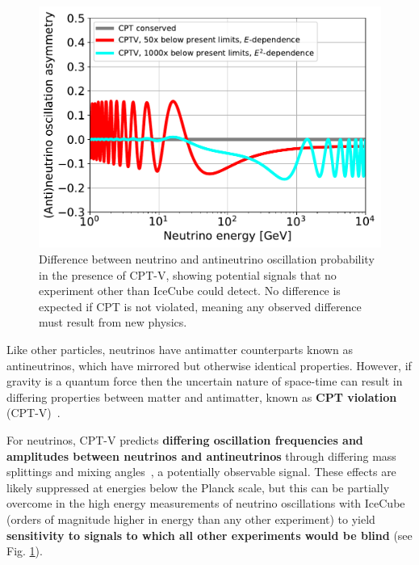 \documentclass[a4paper,11pt]{article}
\begin{document}
\begin{figure} %
    \centering
    \includegraphics[trim=0.0cm 0.0cm 0.cm 0.0cm, clip=true, width=1.\linewidth]{images/cptv_IceCube.pdf}
	\caption{Difference between neutrino and antineutrino oscillation probability in the presence of CPT-V, showing potential signals that no experiment other than IceCube could detect. No difference is expected if CPT is not violated, meaning any observed difference must result from new physics. }
	\label{fig:cptv}
\end{figure}

Like other particles, neutrinos have antimatter counterparts known as antineutrinos, which have mirrored but otherwise identical properties. However, if gravity is a quantum force then the uncertain nature of space-time  can result in differing properties between matter and antimatter, known as \textbf{CPT violation} (CPT-V)~\cite{Mavromatos:2005mi, AmelinoCamelia:2008qg, RalfLehnert:2016grl}. 

For neutrinos, CPT-V predicts \textbf{differing oscillation frequencies and amplitudes between neutrinos and antineutrinos} through differing mass splittings and mixing angles~\cite{Barenboim:2017ewj}, a potentially observable signal. These effects are likely suppressed at energies below the Planck scale, but this can be partially overcome in the high energy measurements of neutrino oscillations with IceCube (orders of magnitude higher in energy than any other experiment) to yield \textbf{sensitivity to signals to which all other experiments would be blind} (see Fig. \ref{fig:cptv}). 
\end{document}
